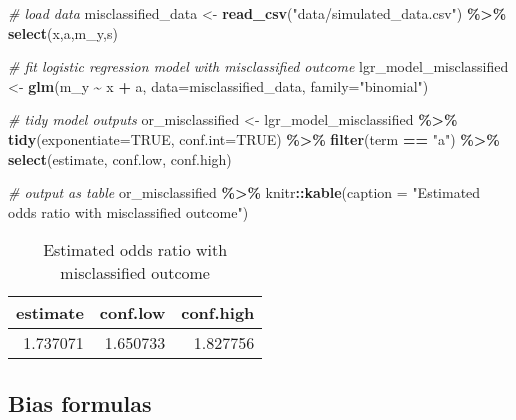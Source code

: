 \documentclass[
]{book}
\newenvironment{Shaded}{\begin{snugshade}}{\end{snugshade}}
\newcommand{\AttributeTok}[1]{\textcolor[rgb]{0.13,0.29,0.53}{#1}}
\newcommand{\CommentTok}[1]{\textcolor[rgb]{0.56,0.35,0.01}{\textit{#1}}}
\newcommand{\ConstantTok}[1]{\textcolor[rgb]{0.56,0.35,0.01}{#1}}
\newcommand{\FunctionTok}[1]{\textcolor[rgb]{0.13,0.29,0.53}{\textbf{#1}}}
\newcommand{\NormalTok}[1]{#1}
\newcommand{\OtherTok}[1]{\textcolor[rgb]{0.56,0.35,0.01}{#1}}
\newcommand{\SpecialCharTok}[1]{\textcolor[rgb]{0.81,0.36,0.00}{\textbf{#1}}}
\newcommand{\StringTok}[1]{\textcolor[rgb]{0.31,0.60,0.02}{#1}}
\begin{document}
\begin{Shaded}
\begin{Highlighting}[]
\CommentTok{\# load data}
\NormalTok{misclassified\_data }\OtherTok{\textless{}{-}} \FunctionTok{read\_csv}\NormalTok{(}\StringTok{"data/simulated\_data.csv"}\NormalTok{) }\SpecialCharTok{\%\textgreater{}\%} \FunctionTok{select}\NormalTok{(x,a,m\_y,s)}

\CommentTok{\# fit logistic regression model with misclassified outcome}
\NormalTok{lgr\_model\_misclassified }\OtherTok{\textless{}{-}} \FunctionTok{glm}\NormalTok{(m\_y }\SpecialCharTok{\textasciitilde{}}\NormalTok{ x }\SpecialCharTok{+}\NormalTok{ a, }\AttributeTok{data=}\NormalTok{misclassified\_data, }\AttributeTok{family=}\StringTok{"binomial"}\NormalTok{) }

\CommentTok{\# tidy model outputs}
\NormalTok{or\_misclassified }\OtherTok{\textless{}{-}}\NormalTok{ lgr\_model\_misclassified }\SpecialCharTok{\%\textgreater{}\%} 
  \FunctionTok{tidy}\NormalTok{(}\AttributeTok{exponentiate=}\ConstantTok{TRUE}\NormalTok{, }\AttributeTok{conf.int=}\ConstantTok{TRUE}\NormalTok{) }\SpecialCharTok{\%\textgreater{}\%} 
  \FunctionTok{filter}\NormalTok{(term }\SpecialCharTok{==} \StringTok{"a"}\NormalTok{) }\SpecialCharTok{\%\textgreater{}\%} 
  \FunctionTok{select}\NormalTok{(estimate, conf.low, conf.high) }

\CommentTok{\# output as table}
\NormalTok{or\_misclassified }\SpecialCharTok{\%\textgreater{}\%}
\NormalTok{  knitr}\SpecialCharTok{::}\FunctionTok{kable}\NormalTok{(}\AttributeTok{caption =} \StringTok{"Estimated odds ratio with misclassified outcome"}\NormalTok{)}
\end{Highlighting}
\end{Shaded}

\begin{table}

\caption{\label{tab:unnamed-chunk-11}Estimated odds ratio with misclassified outcome}
\centering
\begin{tabular}[t]{r|r|r}
\hline
estimate & conf.low & conf.high\\
\hline
1.737071 & 1.650733 & 1.827756\\
\hline
\end{tabular}
\end{table}

\hypertarget{bias-formulas-1}{%
\subsection{Bias formulas}\label{bias-formulas-1}}
\end{document}
